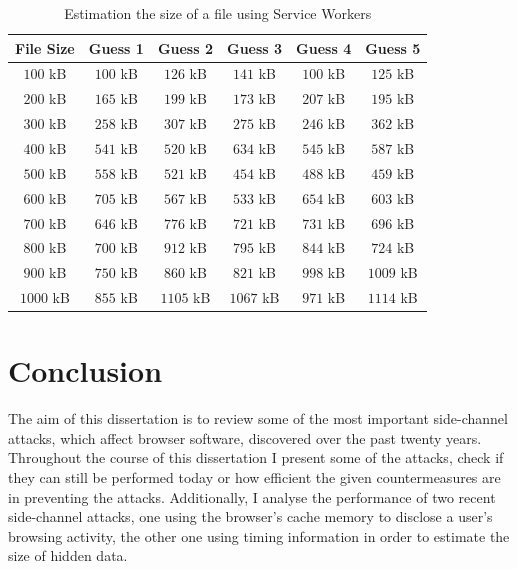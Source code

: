 \documentclass[10pt,a4paper,twoside]{book}
\begin{document}
\begin{table}[h]
\centering
\begin{tabular}{|c|c|c|c|c|c|}
\hline
\textbf{File Size} & \textbf{Guess 1} & \textbf{Guess 2} & \textbf{Guess 3} & \textbf{Guess 4} & \textbf{Guess 5} \\
\hline
$100$ kB & $100$ kB & $126$ kB & $141$ kB & $100$ kB & $125$ kB \\
\hline
$200$ kB & $165$ kB & $199$ kB & $173$ kB & $207$ kB & $195$ kB \\
\hline
$300$ kB & $258$ kB & $307$ kB & $275$ kB & $246$ kB & $362$ kB \\
\hline
$400$ kB & $541$ kB & $520$ kB & $634$ kB & $545$ kB & $587$ kB \\
\hline
$500$ kB & $558$ kB & $521$ kB & $454$ kB & $488$ kB & $459$ kB \\
\hline
$600$ kB & $705$ kB & $567$ kB & $533$ kB & $654$ kB & $603$ kB \\
\hline
$700$ kB & $646$ kB & $776$ kB & $721$ kB & $731$ kB & $696$ kB \\
\hline
$800$ kB & $700$ kB & $912$ kB & $795$ kB & $844$ kB & $724$ kB \\
\hline
$900$ kB & $750$ kB & $860$ kB & $821$ kB & $998$ kB & $1009$ kB \\
\hline
$1000$ kB & $855$ kB & $1105$ kB & $1067$ kB & $971$ kB & $1114$ kB \\
\hline
\end{tabular}
\caption{Estimation the size of a file using Service Workers}
\label{tab:guessSW}
\end{table}


\chapter{Conclusion}
\label{chap:conclusion}

The aim of this dissertation is to review some of the most important side-channel attacks, which affect browser software, discovered over the past twenty years. Throughout the course of this dissertation I present some of the attacks, check if they can still be performed today or how efficient the given countermeasures are in preventing the attacks. Additionally, I analyse the performance of two recent side-channel attacks, one using the browser's cache memory to disclose a user's browsing activity, the other one using timing information in order to estimate the size of hidden data.
\end{document}

